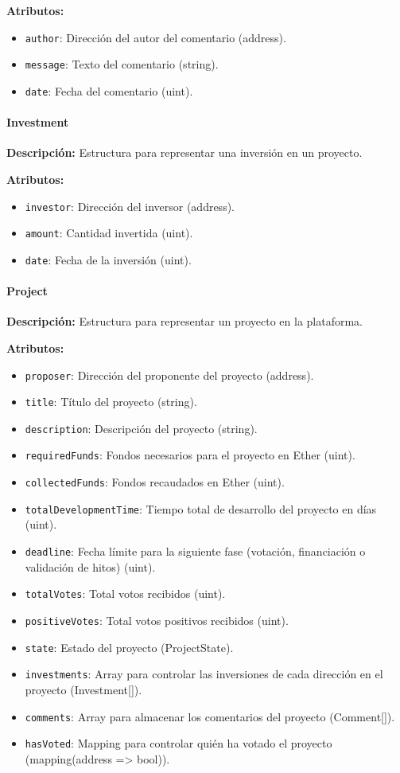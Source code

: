 \textbf{Atributos:}
\begin{itemize}
    \item \texttt{author}: Dirección del autor del comentario (address).
    \item \texttt{message}: Texto del comentario (string).
    \item \texttt{date}: Fecha del comentario (uint).
\end{itemize}

\paragraph{Investment}
\textbf{Descripción:}
Estructura para representar una inversión en un proyecto.

\textbf{Atributos:}
\begin{itemize}
    \item \texttt{investor}: Dirección del inversor (address).
    \item \texttt{amount}: Cantidad invertida (uint).
    \item \texttt{date}: Fecha de la inversión (uint).
\end{itemize}

\paragraph{Project}
\textbf{Descripción:}
Estructura para representar un proyecto en la plataforma.

\textbf{Atributos:}
\begin{itemize}
    \item \texttt{proposer}: Dirección del proponente del proyecto (address).
    \item \texttt{title}: Título del proyecto (string).
    \item \texttt{description}: Descripción del proyecto (string).
    \item \texttt{requiredFunds}: Fondos necesarios para el proyecto en Ether (uint).
    \item \texttt{collectedFunds}: Fondos recaudados en Ether (uint).
    \item \texttt{totalDevelopmentTime}: Tiempo total de desarrollo del proyecto en días (uint).
    \item \texttt{deadline}: Fecha límite para la siguiente fase (votación, financiación o validación de hitos) (uint).
    \item \texttt{totalVotes}: Total votos recibidos (uint).
    \item \texttt{positiveVotes}: Total votos positivos recibidos (uint).
    \item \texttt{state}: Estado del proyecto (ProjectState).
    \item \texttt{investments}: Array para controlar las inversiones de cada dirección en el proyecto (Investment[]).
    \item \texttt{comments}: Array para almacenar los comentarios del proyecto (Comment[]).
    \item \texttt{hasVoted}: Mapping para controlar quién ha votado el proyecto (mapping(address => bool)).
\end{itemize}

